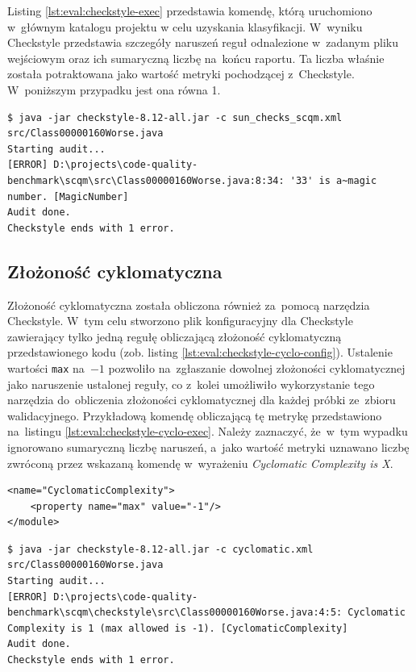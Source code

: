 \documentclass[twoside]{praca}
\begin{document}
Listing \ref{lst:eval:checkstyle-exec} przedstawia komendę, którą uruchomiono w~głównym katalogu projektu \cite{fracz:benchmark} w celu uzyskania klasyfikacji. W~wyniku Checkstyle przedstawia szczegóły naruszeń reguł odnalezione w~zadanym pliku wejściowym oraz ich sumaryczną liczbę na~końcu raportu. Ta liczba właśnie została potraktowana jako wartość metryki pochodzącej z~Checkstyle. W~poniższym przypadku jest ona równa 1.

\begin{lstlisting}[frame=single,caption={Przykład klasyfikacji klasy za~pomocą Checkstyle},captionpos=b,label={lst:eval:checkstyle-exec}]
$ java -jar checkstyle-8.12-all.jar -c sun_checks_scqm.xml src/Class00000160Worse.java
Starting audit...
[ERROR] D:\projects\code-quality-benchmark\scqm\src\Class00000160Worse.java:8:34: '33' is a~magic number. [MagicNumber]
Audit done.
Checkstyle ends with 1 error.
\end{lstlisting}

\subsection{Złożoność cyklomatyczna}
Złożoność cyklomatyczna została obliczona również za~pomocą narzędzia Checkstyle. W~tym celu stworzono plik konfiguracyjny dla Checkstyle zawierający tylko jedną regułę obliczającą złożoność cyklomatyczną przedstawionego kodu (zob. listing \ref{lst:eval:checkstyle-cyclo-config}). Ustalenie wartości \texttt{max} na~$-1$ pozwoliło na~zgłaszanie dowolnej złożoności cyklomatycznej jako naruszenie ustalonej reguły, co z~kolei umożliwiło wykorzystanie tego narzędzia do~obliczenia złożoności cyklomatycznej dla każdej próbki ze~zbioru walidacyjnego. Przykładową komendę obliczającą tę metrykę przedstawiono na~listingu \ref{lst:eval:checkstyle-cyclo-exec}. Należy zaznaczyć, że~w~tym wypadku ignorowano sumaryczną liczbę naruszeń, a~jako wartość metryki uznawano liczbę zwróconą przez wskazaną komendę w~wyrażeniu \textit{Cyclomatic Complexity is X}.

\begin{lstlisting}[frame=single,caption={Konfiguracja Checkstyle dla obliczania złożoności cyklomatycznej},captionpos=b,label={lst:eval:checkstyle-cyclo-config}]
<name="CyclomaticComplexity">
    <property name="max" value="-1"/>
</module>
\end{lstlisting}

\begin{lstlisting}[frame=single,caption={Przykład uzyskania wartości złożoności cyklomatycznej za~pomocą Checkstyle},captionpos=b,label={lst:eval:checkstyle-cyclo-exec}]
$ java -jar checkstyle-8.12-all.jar -c cyclomatic.xml src/Class00000160Worse.java
Starting audit...
[ERROR] D:\projects\code-quality-benchmark\scqm\checkstyle\src\Class00000160Worse.java:4:5: Cyclomatic Complexity is 1 (max allowed is -1). [CyclomaticComplexity]
Audit done.
Checkstyle ends with 1 error.
\end{lstlisting}
\end{document}
